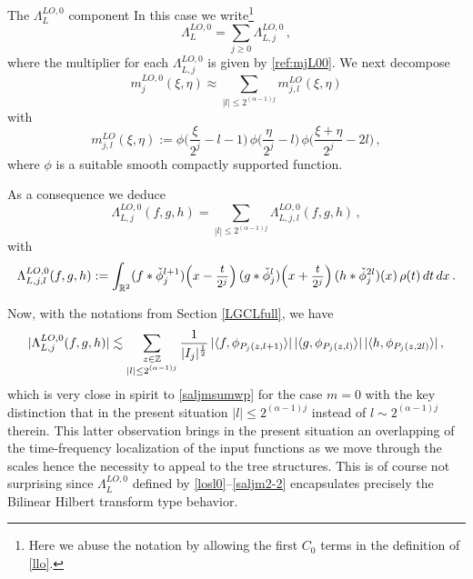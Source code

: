 \documentclass[a4paper,reqno]{amsart}
\makeatletter
\def\subsubsection{\@startsection{subsubsection}{3}%
	\z@{.5\linespacing\@plus.7\linespacing}{-.5em}%
	{\normalfont\bfseries\boldmath}}
\numberwithin{equation}{section}
\theoremstyle{definition}
\newcommand{\R}{\mathbb{R}}
\newcommand{\Z}{\mathbb{Z}}
\newcommand{\sdfrac}[2]{\mbox{\small$\displaystyle\frac{#1}{#2}$}}
\def\a{\alpha}
\def\L{\Lambda}
\makeatother
\begin{document}
\subsubsection{The $\L_{L}^{LO,0}$ component} In this case we write\footnote{Here we abuse the notation by allowing the first $C_0$ terms in the definition of \eqref{llo}.}
\begin{equation}\label{losl0}
\L_{L}^{LO,0}=\sum_{j\geq 0} \L_{L,j}^{LO,0}\,,
\end{equation}
where the multiplier for each $\L_{L,j}^{LO,0}$ is given by \eqref{ref:mjL00}. We next decompose
\begin{equation}\label{salojmm0}
		m_j^{LO,0}(\xi,\eta)\approx\sum_{|l|\leq 2^{(\a-1)j}} m_{j,l}^{LO}(\xi,\eta)
\end{equation}
with
\begin{equation}\label{saljmm1lo}
		m_{j,l}^{LO}(\xi,\eta):=
		\phi\Big(\frac{\xi}{2^{j}}-l-1\Big)\,\phi\Big(\frac{\eta}{2^{j}}-l\Big)\,\phi\Big(\frac{\xi+\eta}{2^{j}}-2l\Big)\,,
\end{equation}
where $\phi$ is a suitable smooth compactly supported function.	

As a consequence we deduce
\begin{equation}\label{saljmsumlo}
\L_{L,j}^{LO,0}(f,g,h)=\sum_{|l|\leq 2^{(\a-1)j}}\L_{L,j,l}^{LO,0}(f,g,h)\,,
\end{equation}
with
\begin{equation}\label{saljm2-2}
\L_{L,j,l}^{LO,0}(f,g,h):=\int_{\R^2}  (f*\check{\phi}_{j}^{l+1})\Big(x-\sdfrac{t}{2^j}\Big)\,(g*\check{\phi}_{j}^l)\Big(x+\sdfrac{t}{2^j}\Big)\,(h*\check{\phi}_{j}^{2l})(x)\,\rho(t)\,dt\,dx\,.
\end{equation}

Now, with the notations from Section \ref{LGCLfull}, we have
\begin{align}\label{saljmsumwplo}
|\L_{L,j}^{LO,0}(f,g,h)|\lesssim\sum_{\substack{z\in\Z\\[.2ex] |l|\leq 2^{(\a-1)j}}} \frac{1}{|I_{j}|^{\frac{1}{2}}}\,|\langle f,  \phi_{P_{j}(z,l+1)}\rangle|\,
|\langle g,  \phi_{P_{j}(z,l)}\rangle|\,|\langle h,  \phi_{P_{j}(z,2l)}\rangle|\,,\raisetag{1\baselineskip}
\end{align}
which is very close in spirit to \eqref{saljmsumwp} for the case $m=0$ with the key distinction that in the present situation $|l|\leq 2^{(\a-1)j}$ instead of $l\sim 2^{(\a-1)j}$ therein. This latter observation brings in the present situation an overlapping of the time-frequency localization of the input functions as we move through the scales hence the necessity to appeal to the tree structures. This is of course not surprising since $\L_{L}^{LO,0}$ defined by \eqref{losl0}--\eqref{saljm2-2} encapsulates precisely the Bilinear Hilbert transform type behavior.
\end{document}
